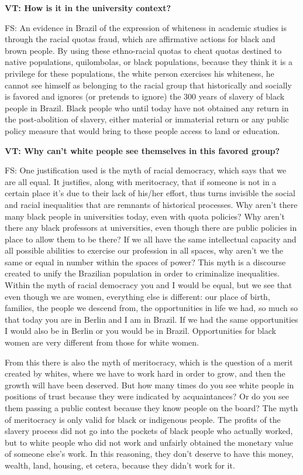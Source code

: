 \documentclass[a4paper,
fontsize=11pt,
oneside,
numbers=noperiodatend,
parskip=half-,
bibliography=totoc,
final
]{scrartcl}
\begin{document}
\textbf{VT: How is it in the university context?}

FS: An evidence in Brazil of the expression of whiteness in academic
studies is through the racial quotas fraud, which are affirmative
actions for black and brown people. By using these ethno-racial quotas
to cheat quotas destined to native populations, quilombolas, or black
populations, because they think it is a privilege for these populations,
the white person exercises his whiteness, he cannot see himself as
belonging to the racial group that historically and socially is favored
and ignores (or pretends to ignore) the 300 years of slavery of black
people in Brazil. Black people who until today have not obtained any
return in the post-abolition of slavery, either material or immaterial
return or any public policy measure that would bring to these people
access to land or education.

\textbf{VT: Why can't white people see themselves in this favored
group?}

FS: One justification used is the myth of racial democracy, which says
that we are all equal. It justifies, along with meritocracy, that if
someone is not in a certain place it's due to their lack of his/her
effort, thus turns invisible the social and racial inequalities that are
remnants of historical processes. Why aren't there many black people in
universities today, even with quota policies? Why aren't there any black
professors at universities, even though there are public policies in
place to allow them to be there? If we all have the same intellectual
capacity and all possible abilities to exercise our profession in all
spaces, why aren't we the same or equal in number within the spaces of
power? This myth is a discourse created to unify the Brazilian
population in order to criminalize inequalities. Within the myth of
racial democracy you and I would be equal, but we see that even though
we are women, everything else is different: our place of birth,
families, the people we descend from, the opportunities in life we had,
so much so that today you are in Berlin and I am in Brazil. If we had
the same opportunities I would also be in Berlin or you would be in
Brazil. Opportunities for black women are very different from those for
white women.

From this there is also the myth of meritocracy, which is the question
of a merit created by whites, where we have to work hard in order to
grow, and then the growth will have been deserved. But how many times do
you see white people in positions of trust because they were indicated
by acquaintances? Or do you see them passing a public contest because
they know people on the board? The myth of meritocracy is only valid for
black or indigenous people. The profits of the slavery process did not
go into the pockets of black people who actually worked, but to white
people who did not work and unfairly obtained the monetary value of
someone else's work. In this reasoning, they don't deserve to have this
money, wealth, land, housing, et cetera, because they didn't work for
it.
\end{document}
